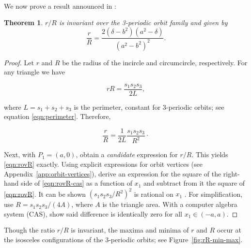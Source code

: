 \documentclass{article}
\newtheorem{theorem}{Theorem}
\theoremstyle{definition}
\begin{document}
\noindent We now prove a result announced in  \cite{reznik2019-intelligencer}:

\begin{theorem}
\label{thm:rovR}
$r/R$ is invariant over the 3-periodic orbit family and given by
\begin{equation}
\label{eqn:rovR}
\frac{r}{R}=\frac{2 (\delta-b^2)(a^2-\delta)}{(a^2-b^2)^2}.
\end{equation}
\end{theorem}

\begin{proof}
Let $r$ and $R$ be the radius of the incircle and circumcircle, respectively. For any triangle \cite{coxeter67} we have

\begin{equation*}
 rR=\frac{s_1s_2s_3}{2 L}, 
\end{equation*}

\noindent where $L=s_1+s_2+s_3$ is the perimeter, constant for 3-periodic orbits; see equation \eqref{eqn:perimeter}. Therefore,

\begin{equation}
\frac{r}{R}=\frac{1}{2L} \frac{s_1s_2s_3}{R^2}\cdot
\label{eqn:rovR-cas}
\end{equation}

Next, with $P_1=(a,0)$, obtain a {\em candidate} expression for $r/R$. This yields \eqref{eqn:rovR} exactly. Using explicit expressions for orbit vertices (see Appendix~\ref{app:orbit-vertices}), derive an expression for the square of the right-hand side of \eqref{eqn:rovR-cas} as a function of $x_1$ and subtract from it the square of \eqref{eqn:rovR}. It can be shown $\left(s_1s_2s_3/R^2\right)^2$ is rational on $x_1$ \cite{reznik2020-loci}. For simplification, use $R=s_1 s_2 s_3/(4A)$, where $A$ is the triangle area. With a computer algebra system (CAS), show said difference is identically zero for all $x_1\in(-a,a)$.
\end{proof}

Though the ratio $r/R$ is invariant, the maxima and minima of $r$ and $R$ occur at the isosceles configurations of the 3-periodic orbits; see Figure~\ref{fig:rR-min-max}. 
\end{document}

